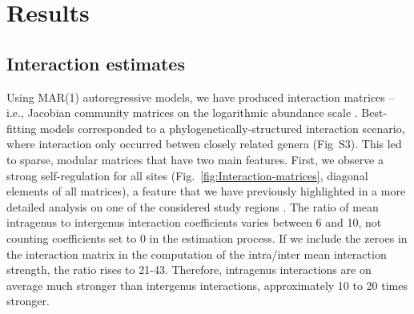 \documentclass[10pt]{article}
\begin{document}
\section*{Results}

\subsection*{Interaction estimates}

Using MAR(1) autoregressive models, we have produced interaction matrices
\citep{ives_estimating_2003,hampton2013quantifying} -- i.e., Jacobian
community matrices on the logarithmic abundance scale \citep{ives_estimating_2003}.
Best-fitting models corresponded to a phylogenetically-structured
interaction scenario, where interaction only occurred betwen closely
related genera (Fig~S3). This led to sparse, modular matrices that
have two main features. First, we observe a strong self-regulation
for all sites (Fig.~\ref{fig:Interaction-matrices}, diagonal elements
of all matrices), a feature that we have previously highlighted in
a more detailed analysis on one of the considered study regions \citep{barraquand_coastal_2018}.
The ratio of mean intragenus to intergenus interaction coefficients
varies between 6 and 10, not counting coefficients set to 0 in the
estimation process. If we include the zeroes in the interaction matrix
in the computation of the intra/inter mean interaction strength, the
ratio rises to 21-43. Therefore, intragenus interactions are on average
much stronger than intergenus interactions, approximately 10 to 20
times stronger.
\end{document}
